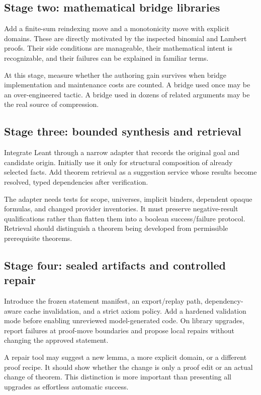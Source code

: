 \documentclass[11pt,a4paper]{article}
\theoremstyle{remark}
\begin{document}
\subsection{Stage two: mathematical bridge libraries}
Add a finite-sum reindexing move and a monotonicity move with explicit domains. These are directly motivated by the inspected binomial and Lambert proofs. Their side conditions are manageable, their mathematical intent is recognizable, and their failures can be explained in familiar terms.

At this stage, measure whether the authoring gain survives when bridge implementation and maintenance costs are counted. A bridge used once may be an over-engineered tactic. A bridge used in dozens of related arguments may be the real source of compression.

\subsection{Stage three: bounded synthesis and retrieval}
Integrate Leant through a narrow adapter that records the original goal and candidate origin. Initially use it only for structural composition of already selected facts. Add theorem retrieval as a suggestion service whose results become resolved, typed dependencies after verification.

The adapter needs tests for scope, universes, implicit binders, dependent opaque formulas, and changed provider inventories. It must preserve negative-result qualifications rather than flatten them into a boolean success/failure protocol. Retrieval should distinguish a theorem being developed from permissible prerequisite theorems.

\subsection{Stage four: sealed artifacts and controlled repair}
Introduce the frozen statement manifest, an export/replay path, dependency-aware cache invalidation, and a strict axiom policy. Add a hardened validation mode before enabling unreviewed model-generated code. On library upgrades, report failures at proof-move boundaries and propose local repairs without changing the approved statement.

A repair tool may suggest a new lemma, a more explicit domain, or a different proof recipe. It should show whether the change is only a proof edit or an actual change of theorem. This distinction is more important than presenting all upgrades as effortless automatic success.
\end{document}

